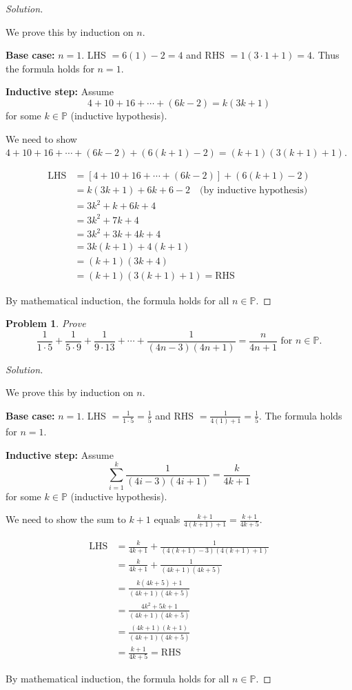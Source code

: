 \documentclass[12pt]{article}
\newtheorem{problem}{Problem}
\newcommand{\PP}{\ensuremath{\mathbb{P}}}
\begin{document}
\begin{proof}[Solution]
~

We prove this by induction on $n$.

\textbf{Base case:} $n = 1$. LHS $= 6(1) - 2 = 4$ and RHS $= 1(3 \cdot 1 + 1) = 4$. Thus the formula holds for $n = 1$.

\textbf{Inductive step:} Assume 
$$4 + 10 + 16 + \cdots + (6k - 2) = k(3k + 1)$$
for some $k \in \PP$ (inductive hypothesis).

We need to show $4 + 10 + 16 + \cdots + (6k - 2) + (6(k+1) - 2) = (k+1)(3(k+1) + 1)$.

\begin{align*}
\text{LHS} &= [4 + 10 + 16 + \cdots + (6k - 2)] + (6(k+1) - 2) \\
&= k(3k + 1) + 6k + 6 - 2 \quad \text{(by inductive hypothesis)} \\
&= 3k^2 + k + 6k + 4 \\
&= 3k^2 + 7k + 4 \\
&= 3k^2 + 3k + 4k + 4 \\
&= 3k(k + 1) + 4(k + 1) \\
&= (k + 1)(3k + 4) \\
&= (k + 1)(3(k+1) + 1) = \text{RHS}
\end{align*}

By mathematical induction, the formula holds for all $n \in \PP$.
\end{proof}


\setcounter{problem}{7}
\begin{problem}
Prove
$$\frac{1}{1 \cdot 5} + \frac{1}{5 \cdot 9} + \frac{1}{9 \cdot 13} + \cdots + \frac{1}{(4n - 3)(4n + 1)} = \frac{n}{4n + 1} \text{ for } n \in \PP.$$
\end{problem}

\begin{proof}[Solution]
~

We prove this by induction on $n$.

\textbf{Base case:} $n = 1$. LHS $= \frac{1}{1 \cdot 5} = \frac{1}{5}$ and RHS $= \frac{1}{4(1) + 1} = \frac{1}{5}$. The formula holds for $n = 1$.

\textbf{Inductive step:} Assume 
$$\sum_{i=1}^{k} \frac{1}{(4i - 3)(4i + 1)} = \frac{k}{4k + 1}$$
for some $k \in \PP$ (inductive hypothesis).

We need to show the sum to $k+1$ equals $\frac{k+1}{4(k+1) + 1} = \frac{k+1}{4k + 5}$.

\begin{align*}
\text{LHS} &= \frac{k}{4k + 1} + \frac{1}{(4(k+1) - 3)(4(k+1) + 1)} \\
&= \frac{k}{4k + 1} + \frac{1}{(4k + 1)(4k + 5)} \\
&= \frac{k(4k + 5) + 1}{(4k + 1)(4k + 5)} \\
&= \frac{4k^2 + 5k + 1}{(4k + 1)(4k + 5)} \\
&= \frac{(4k + 1)(k + 1)}{(4k + 1)(4k + 5)} \\
&= \frac{k + 1}{4k + 5} = \text{RHS}
\end{align*}

By mathematical induction, the formula holds for all $n \in \PP$.
\end{proof}
\end{document}
